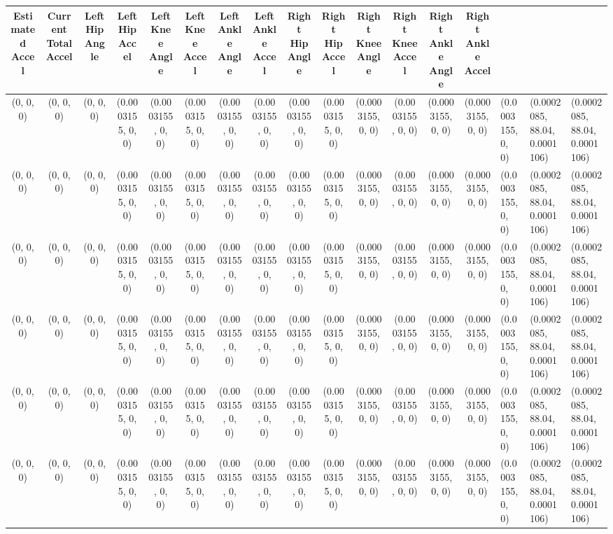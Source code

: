 \begin{tabular}{| c | c | c | c | c | c | c | c | c | c | c | c | c | c |}
	Estimated Accel & Current Total Accel & Left Hip Angle & Left Hip Accel & Left Knee Angle & Left Knee Accel & Left Ankle Angle & Left Ankle Accel & Right Hip Angle & Right Hip Accel & Right Knee Angle & Right Knee Accel & Right Ankle Angle & Right Ankle Accel \\ \hline
	(0, 0, 0) & (0, 0, 0) & (0, 0, 0) & (0.0003155, 0, 0) & (0.0003155, 0, 0) & (0.0003155, 0, 0) & (0.0003155, 0, 0) & (0.0003155, 0, 0) & (0.0003155, 0, 0) & (0.0003155, 0, 0) & (0.0003155, 0, 0) & (0.0003155, 0, 0) & (0.0003155, 0, 0) & (0.0003155, 0, 0) & (0.0003155, 0, 0) & (0.0002085, 88.04, 0.0001106) & (0.0002085, 88.04, 0.0001106) \\ \hline
	(0, 0, 0) & (0, 0, 0) & (0, 0, 0) & (0.0003155, 0, 0) & (0.0003155, 0, 0) & (0.0003155, 0, 0) & (0.0003155, 0, 0) & (0.0003155, 0, 0) & (0.0003155, 0, 0) & (0.0003155, 0, 0) & (0.0003155, 0, 0) & (0.0003155, 0, 0) & (0.0003155, 0, 0) & (0.0003155, 0, 0) & (0.0003155, 0, 0) & (0.0002085, 88.04, 0.0001106) & (0.0002085, 88.04, 0.0001106) \\ \hline
	(0, 0, 0) & (0, 0, 0) & (0, 0, 0) & (0.0003155, 0, 0) & (0.0003155, 0, 0) & (0.0003155, 0, 0) & (0.0003155, 0, 0) & (0.0003155, 0, 0) & (0.0003155, 0, 0) & (0.0003155, 0, 0) & (0.0003155, 0, 0) & (0.0003155, 0, 0) & (0.0003155, 0, 0) & (0.0003155, 0, 0) & (0.0003155, 0, 0) & (0.0002085, 88.04, 0.0001106) & (0.0002085, 88.04, 0.0001106) \\ \hline
	(0, 0, 0) & (0, 0, 0) & (0, 0, 0) & (0.0003155, 0, 0) & (0.0003155, 0, 0) & (0.0003155, 0, 0) & (0.0003155, 0, 0) & (0.0003155, 0, 0) & (0.0003155, 0, 0) & (0.0003155, 0, 0) & (0.0003155, 0, 0) & (0.0003155, 0, 0) & (0.0003155, 0, 0) & (0.0003155, 0, 0) & (0.0003155, 0, 0) & (0.0002085, 88.04, 0.0001106) & (0.0002085, 88.04, 0.0001106) \\ \hline
	(0, 0, 0) & (0, 0, 0) & (0, 0, 0) & (0.0003155, 0, 0) & (0.0003155, 0, 0) & (0.0003155, 0, 0) & (0.0003155, 0, 0) & (0.0003155, 0, 0) & (0.0003155, 0, 0) & (0.0003155, 0, 0) & (0.0003155, 0, 0) & (0.0003155, 0, 0) & (0.0003155, 0, 0) & (0.0003155, 0, 0) & (0.0003155, 0, 0) & (0.0002085, 88.04, 0.0001106) & (0.0002085, 88.04, 0.0001106) \\ \hline
	(0, 0, 0) & (0, 0, 0) & (0, 0, 0) & (0.0003155, 0, 0) & (0.0003155, 0, 0) & (0.0003155, 0, 0) & (0.0003155, 0, 0) & (0.0003155, 0, 0) & (0.0003155, 0, 0) & (0.0003155, 0, 0) & (0.0003155, 0, 0) & (0.0003155, 0, 0) & (0.0003155, 0, 0) & (0.0003155, 0, 0) & (0.0003155, 0, 0) & (0.0002085, 88.04, 0.0001106) & (0.0002085, 88.04, 0.0001106) \\ \hline

\end{tabular}
